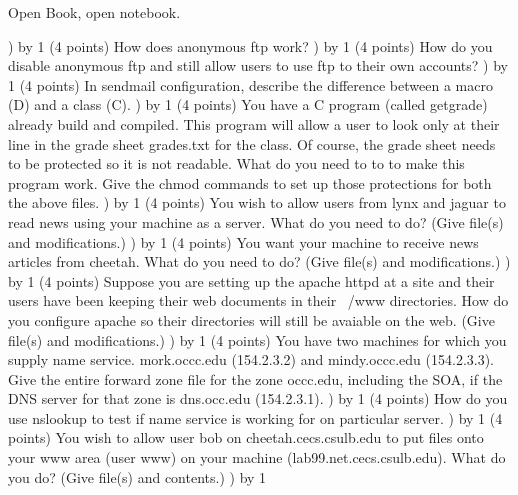 
\parindent=0in
\nopagenumbers
\newcount\quesno
{}
\def\ques{\number\quesno) \advance\quesno by 1}
\def\aspace{\vskip 1.5in}

Open Book, open notebook.

\ques
(4 points)
How does anonymous ftp work?
\vskip 2.0in
\ques
(4 points)
How do you disable anonymous ftp and still
allow users to use ftp to their own accounts?
\vskip 0.8in
\ques
(4 points)
In sendmail configuration,
describe the difference between a macro ({\ltt{}D})
and a class ({\ltt{}C}).
\vskip 1.2in
\ques
(4 points)
You have a C program (called {\ltt{}getgrade}) already build and compiled.
This program will allow a user to look only at their line in the
grade sheet {\ltt{}grades.txt} for the class.
Of course, the grade sheet needs to be protected so it is not readable.
What do you need to to to make this program work.
Give the chmod commands to
set up those protections for both the above files.
\vskip 1.0in
\ques
(4 points)
You wish to allow users from {\ltt{}lynx} and {\ltt{}jaguar} to
read news using your machine as a server.
What do you need to do? (Give file(s) and modifications.)
\vskip 0.8in
\vfill\eject
\ques
(4 points)
You want your machine to receive news articles from {\ltt{}cheetah}.
What do you need to do?
(Give file(s) and modifications.)
\vskip 1.9in
\ques
(4 points)
Suppose you are setting up the apache httpd at a site and
their users have been keeping their web documents
in their {\ltt{}~/www} directories.
How do you configure apache so their directories will
still be avaiable on the web.
(Give file(s) and modifications.)
\vskip 1.5in
\ques
(4 points)
You have two machines for which you supply name service.
{\ltt{}mork.occc.edu} (154.2.3.2) and 
{\ltt{}mindy.occc.edu} (154.2.3.3).
Give the entire forward zone file for the zone {\ltt{}occc.edu},
including the SOA, if the DNS server for that zone
is {\ltt{}dns.occ.edu} ({\ltt{}154.2.3.1}).
\vfill\eject
\ques
(4 points)
How do you use {\ltt{}nslookup} to test if name service is working for
on particular server.
\vskip 1.8in
\ques
(4 points)
You wish to allow user {\ltt{}bob} on {\ltt{}cheetah.cecs.csulb.edu}
to put files onto your www area (user {\ltt{}www}) on 
your machine ({\ltt{}lab99.net.cecs.csulb.edu}).
What do you do?
(Give file(s) and contents.)
\vskip 1.0in
\ques

